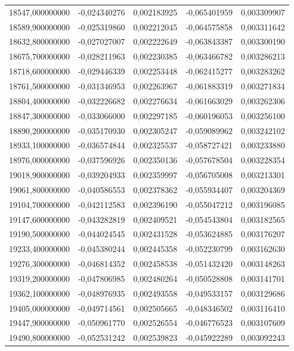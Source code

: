 \begin{longtable}{rrrrr}
18547,000000000 & -0,024340276 & 0,002183925 & -0,065401959 & 0,003309907\\
18589,900000000 & -0,025319860 & 0,002212045 & -0,064575858 & 0,003311642\\
18632,800000000 & -0,027027007 & 0,002222649 & -0,063843387 & 0,003300190\\
18675,700000000 & -0,028211963 & 0,002230385 & -0,063466782 & 0,003286213\\
18718,600000000 & -0,029446339 & 0,002253448 & -0,062415277 & 0,003283262\\
18761,500000000 & -0,031346953 & 0,002263967 & -0,061883319 & 0,003271834\\
18804,400000000 & -0,032226682 & 0,002276634 & -0,061663029 & 0,003262306\\
18847,300000000 & -0,033066000 & 0,002297185 & -0,060196053 & 0,003256100\\
18890,200000000 & -0,035170930 & 0,002305247 & -0,059089962 & 0,003242102\\
18933,100000000 & -0,036574844 & 0,002325537 & -0,058727421 & 0,003233880\\
18976,000000000 & -0,037596926 & 0,002350136 & -0,057678504 & 0,003228354\\
19018,900000000 & -0,039204933 & 0,002359997 & -0,056705008 & 0,003213301\\
19061,800000000 & -0,040586553 & 0,002378362 & -0,055934407 & 0,003204369\\
19104,700000000 & -0,042112583 & 0,002396190 & -0,055047212 & 0,003196085\\
19147,600000000 & -0,043282819 & 0,002409521 & -0,054543804 & 0,003182565\\
19190,500000000 & -0,044024545 & 0,002431528 & -0,053624885 & 0,003176207\\
19233,400000000 & -0,045380244 & 0,002445358 & -0,052230799 & 0,003162630\\
19276,300000000 & -0,046814352 & 0,002458538 & -0,051432420 & 0,003148263\\
19319,200000000 & -0,047806985 & 0,002480264 & -0,050528808 & 0,003141701\\
19362,100000000 & -0,048976935 & 0,002493558 & -0,049533157 & 0,003129686\\
19405,000000000 & -0,049714561 & 0,002505665 & -0,048346502 & 0,003116410\\
19447,900000000 & -0,050961770 & 0,002526554 & -0,046776523 & 0,003107609\\
19490,800000000 & -0,052531242 & 0,002539823 & -0,045922289 & 0,003092243\\

\end{longtable}
